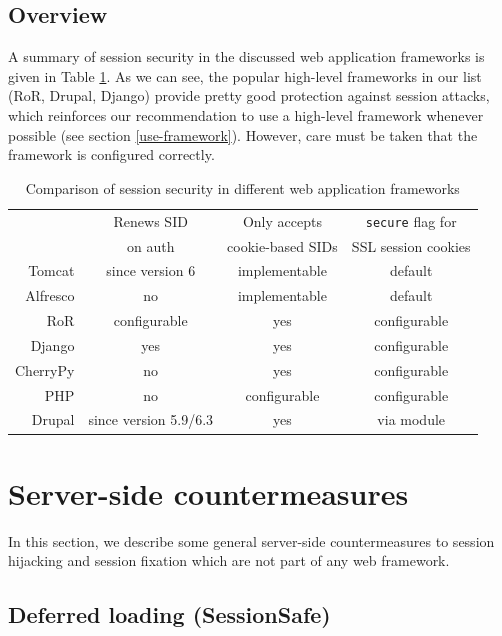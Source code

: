 \subsection{Overview}

A summary of session security in the discussed web application frameworks is given in Table \ref{tab:frameworks}. As we can see, the popular high-level frameworks in our list (RoR, Drupal, Django) provide pretty good protection against session attacks, which reinforces our recommendation to use a high-level framework whenever possible (see section \ref{use-framework}). However, care must be taken that the framework is configured correctly.

\begin{table}[htb]
	\centering
	\begin{tabular}{r|ccc}
		& Renews SID & Only accepts & \texttt{secure} flag for\\
		& on auth & cookie-based SIDs & SSL session cookies\\
		\hline
		Tomcat & since version 6 & implementable & default\\
		Alfresco & no & implementable & default\\
		RoR & configurable & yes & configurable\\
		Django & yes & yes & configurable\\
		CherryPy & no & yes & configurable\\
		PHP & no & configurable & configurable\\
		Drupal & since version 5.9/6.3 & yes & via module\\
	\end{tabular}
	\caption{Comparison of session security in different web application frameworks}
	\label{tab:frameworks}
\end{table}

\section{Server-side countermeasures}\label{standalone-server}

In this section, we describe some general server-side countermeasures to session hijacking and session fixation which are not part of any web framework.

\subsection{Deferred loading (SessionSafe)}

